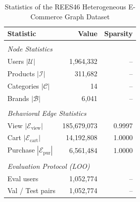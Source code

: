 \begin{table}[t]
\centering
\caption{Statistics of the REES46 Heterogeneous E-Commerce Graph Dataset}
\label{tab:dataset_statistics}
\begin{tabular}{lrr}
\toprule
\textbf{Statistic} & \textbf{Value} & \textbf{Sparsity} \\
\midrule \\
\multicolumn{3}{l}{\textit{Node Statistics}} \\
Users $|\mathcal{U}|$ & 1,964,332 & -- \\
Products $|\mathcal{I}|$ & 311,682 & -- \\
Categories $|\mathcal{C}|$ & 14 & -- \\
Brands $|\mathcal{B}|$ & 6,041 & -- \\
\midrule \\
\multicolumn{3}{l}{\textit{Behavioral Edge Statistics}} \\
View  $|\mathcal{E}_{\text{view}}|$ & 185,679,073 & 0.9997 \\
Cart  $|\mathcal{E}_{\text{cart}}|$ & 14,192,808 & 1.0000 \\
Purchase  $|\mathcal{E}_{\text{pur}}|$ & 6,561,484 & 1.0000 \\
\midrule \\
\multicolumn{3}{l}{\textit{Evaluation Protocol (LOO)}} \\
Eval users & 1,052,774 & -- \\
Val / Test pairs & 1,052,774 & -- \\
\bottomrule
\end{tabular}
\end{table}